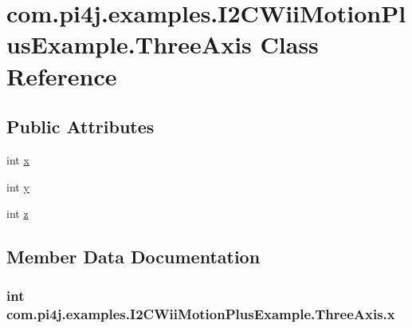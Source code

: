 \hypertarget{classcom_1_1pi4j_1_1examples_1_1I2CWiiMotionPlusExample_1_1ThreeAxis}{}\section{com.\+pi4j.\+examples.\+I2\+C\+Wii\+Motion\+Plus\+Example.\+Three\+Axis Class Reference}
\label{classcom_1_1pi4j_1_1examples_1_1I2CWiiMotionPlusExample_1_1ThreeAxis}
\subsection*{Public Attributes}
\begin{DoxyCompactItemize}
\item 
int \hyperlink{classcom_1_1pi4j_1_1examples_1_1I2CWiiMotionPlusExample_1_1ThreeAxis_a50f255ff981b2b2d64301a7439bf07ba}{x}
\item 
int \hyperlink{classcom_1_1pi4j_1_1examples_1_1I2CWiiMotionPlusExample_1_1ThreeAxis_a271c8a23d3b08a697207aeabbb4fc523}{y}
\item 
int \hyperlink{classcom_1_1pi4j_1_1examples_1_1I2CWiiMotionPlusExample_1_1ThreeAxis_a49d88e91188af7cc75cb642be222ebd9}{z}
\end{DoxyCompactItemize}


\subsection{Member Data Documentation}
\hypertarget{classcom_1_1pi4j_1_1examples_1_1I2CWiiMotionPlusExample_1_1ThreeAxis_a50f255ff981b2b2d64301a7439bf07ba}{}
\subsubsection[{x}]{\setlength{\rightskip}{0pt plus 5cm}int com.\+pi4j.\+examples.\+I2\+C\+Wii\+Motion\+Plus\+Example.\+Three\+Axis.\+x}\label{classcom_1_1pi4j_1_1examples_1_1I2CWiiMotionPlusExample_1_1ThreeAxis_a50f255ff981b2b2d64301a7439bf07ba}
\hypertarget{classcom_1_1pi4j_1_1examples_1_1I2CWiiMotionPlusExample_1_1ThreeAxis_a271c8a23d3b08a697207aeabbb4fc523}{}
